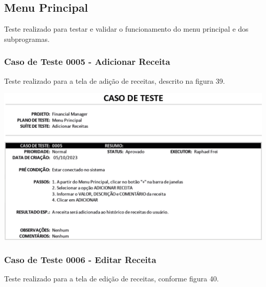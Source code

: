 \subsection{Menu Principal}

Teste realizado para testar e validar o funcionamento do menu principal e dos subprogramas.

\subsubsection{Caso de Teste 0005 - Adicionar Receita}

Teste realizado para a tela de adição de receitas, descrito na figura 39.

    \begin{center}
        \begin{minipage}{\textwidth}
            \centering
            \includegraphics[scale=0.8]{figs/caso-testes-0005.png}
            \label{fig:figura39}
        \end{minipage}
    \end{center} 

\subsubsection{Caso de Teste 0006 - Editar Receita}

Teste realizado para a tela de edição de receitas, conforme figura 40.

